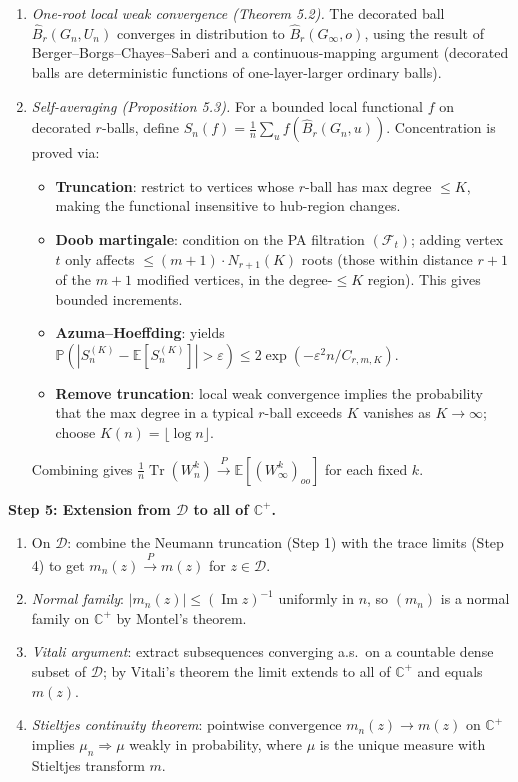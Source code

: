 \documentclass[11pt,a4paper]{article}
\begin{document}
\begin{enumerate}[label=(\alph*)]
  \item \emph{One-root local weak convergence (Theorem 5.2).} The decorated ball $\widehat{B}_r(G_n,U_n)$ converges in distribution to $\widehat{B}_r(G_\infty,o)$, using the result of Berger--Borgs--Chayes--Saberi and a continuous-mapping argument (decorated balls are deterministic functions of one-layer-larger ordinary balls).
  \item \emph{Self-averaging (Proposition 5.3).} For a bounded local functional $f$ on decorated $r$-balls, define $S_n(f) = \frac{1}{n}\sum_u f(\widehat{B}_r(G_n,u))$. Concentration is proved via:
  \begin{itemize}
    \item \textbf{Truncation}: restrict to vertices whose $r$-ball has max degree $\le K$, making the functional insensitive to hub-region changes.
    \item \textbf{Doob martingale}: condition on the PA filtration $(\mathcal{F}_t)$; adding vertex $t$ only affects $\le (m+1)\cdot N_{r+1}(K)$ roots (those within distance $r+1$ of the $m+1$ modified vertices, in the degree-$\le K$ region). This gives bounded increments.
    \item \textbf{Azuma--Hoeffding}: yields $\mathbb{P}(|S_n^{(K)} - \mathbb{E}[S_n^{(K)}]|>\varepsilon) \le 2\exp(-\varepsilon^2 n / C_{r,m,K})$.
    \item \textbf{Remove truncation}: local weak convergence implies the probability that the max degree in a typical $r$-ball exceeds $K$ vanishes as $K\to\infty$; choose $K(n)=\lfloor\log n\rfloor$.
  \end{itemize}
  Combining gives $\frac{1}{n}\operatorname{Tr}(W_n^k) \xrightarrow{P} \mathbb{E}[(W_\infty^k)_{oo}]$ for each fixed $k$.
\end{enumerate}

\medskip
\noindent\textbf{Step 5: Extension from $\mathcal{D}$ to all of $\mathbb{C}^+$.}

\begin{enumerate}[label=(\alph*)]
  \item On $\mathcal{D}$: combine the Neumann truncation (Step 1) with the trace limits (Step 4) to get $m_n(z)\xrightarrow{P} m(z)$ for $z\in\mathcal{D}$.
  \item \emph{Normal family}: $|m_n(z)|\le (\operatorname{Im} z)^{-1}$ uniformly in $n$, so $(m_n)$ is a normal family on $\mathbb{C}^+$ by Montel's theorem.
  \item \emph{Vitali argument}: extract subsequences converging a.s.\ on a countable dense subset of $\mathcal{D}$; by Vitali's theorem the limit extends to all of $\mathbb{C}^+$ and equals $m(z)$.
  \item \emph{Stieltjes continuity theorem}: pointwise convergence $m_n(z)\to m(z)$ on $\mathbb{C}^+$ implies $\mu_n\Rightarrow\mu$ weakly in probability, where $\mu$ is the unique measure with Stieltjes transform $m$.
\end{enumerate}
\end{document}

